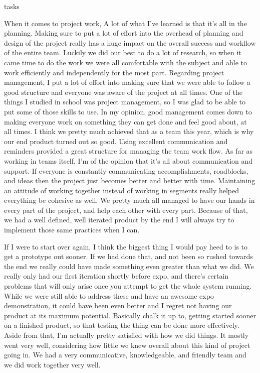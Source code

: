 tasks\documentclass[onecolumn, draftclsnofoot,10pt, compsoc]{IEEEtran}
\begin{document}
When it comes to project work, A lot of what I've learned is that it's all in the planning.
Making sure to put a lot of effort into the overhead of planning and design of the project really has a huge impact on the overall success and workflow of the entire team.
Luckily we did our best to do a lot of research, so when it came time to do the work we were all comfortable with the subject and able to work efficiently and independently for the most part.
Regarding project management, I put a lot of effort into making sure that we were able to follow a good structure and everyone was aware of the project at all times.
One of the things I studied in school was project management, so I was glad to be able to put some of those skills to use.
In my opinion, good management comes down to making everyone work on something they can get done and feel good about, at all times.
I think we pretty much achieved that as a team this year, which is why our end product turned out so good.
Using excellent communication and reminders provided a great structure for managing the team work flow.
As far as working in teams itself, I'm of the opinion that it's all about communication and support.
If everyone is constantly communicating accomplishments, roadblocks, and ideas then the project just becomes better and better with time.
Maintaining an attitude of working together instead of working in segments really helped everything be cohesive as well.
We pretty much all managed to have our hands in every part of the project, and help each other with every part.
Because of that, we had a well defined, well iterated product by the end I will always try to implement those same practices when I can.

If I were to start over again, I think the biggest thing I would pay heed to is to get a prototype out sooner.
If we had done that, and not been so rushed towards the end we really could have made something even greater than what we did.
We really only had our first iteration shortly before expo, and there's certain problems that will only arise once you attempt to get the whole system running.
While we were still able to address these and have an awesome expo demonstration, it could have been even better and I regret not having our product at its maximum potential.
Basically chalk it up to, getting started sooner on a finished product, so that testing the thing can be done more effectively.
Aside from that, I'm actually pretty satisfied with how we did things.
It mostly went very well, considering how little we knew overall about this kind of project going in.
We had a very communicative, knowledgeable, and friendly team and we did work together very well.
\end{document}
